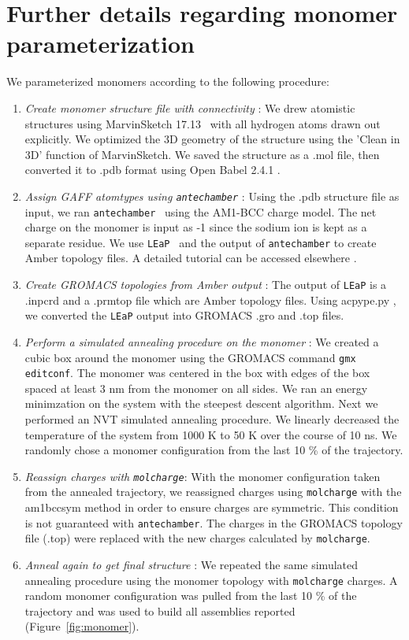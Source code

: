 \documentclass[journal=jpcbfk,manusciprt=article]{achemso}
\begin{document}
  \section{Further details regarding monomer parameterization}\label{section:parameterization}
 
  \vspace{1em}
  We parameterized monomers according to the following procedure:
  \begin{enumerate}
	\item \textit{Create monomer structure file with connectivity} : We
	drew atomistic structures using MarvinSketch
	17.13~\cite{chemaxon_marvinsketch_2017} with all hydrogen atoms drawn out
	explicitly. We optimized the 3D geometry of the structure using the 'Clean in
	3D' function of MarvinSketch.  We saved the structure as a .mol file, then
	converted it to .pdb format using Open Babel 2.4.1
	\cite{oboyle_open_2011,noauthor_open_nodate}. 
	\item \textit{Assign GAFF atomtypes using \texttt{antechamber}} : Using
	the .pdb structure file as input, we ran
	\texttt{antechamber}~\cite{wang_automatic_2006} using the AM1-BCC charge model.
	The net charge on the monomer is input as -1 since the sodium ion is kept as 
	a separate residue. We use \texttt{LEaP}~\cite{case_ambertools16_2016} and the
	output of \texttt{antechamber} to create Amber topology files. A detailed
	tutorial can be accessed elsewhere \cite{walker_antechamber_nodate}.
	\item \textit{Create GROMACS topologies from Amber output} : The output
	of \texttt{LEaP} is a .inpcrd and a .prmtop file which are Amber topology
	files. Using acpype.py \cite{sousa_da_silva_acpype_2012}, we converted the
	\texttt{LEaP} output into GROMACS .gro and .top files. 
	\item \textit{Perform a simulated annealing procedure on the monomer} :
	We created a cubic box around the monomer using the GROMACS command \texttt{gmx
	editconf}. The monomer was centered in the box with edges of the
	box spaced at least 3 nm from the monomer on all sides. We ran an energy minimzation
	on the system with the steepest descent algorithm. Next we performed an NVT
	simulated annealing procedure. We linearly decreased the temperature of the
	system from 1000 K to 50 K over the course of 10 ns. We randomly chose a monomer
	configuration from the last 10 \% of the trajectory. 
	\item \textit{Reassign charges with \texttt{molcharge}}: With the monomer
	configuration taken from the annealed trajectory, we reassigned charges using
	\texttt{molcharge} with the am1bccsym method in order to ensure charges 
	are symmetric. This condition is not guaranteed with \texttt{antechamber}. 
	The charges in the GROMACS topology file (.top) were replaced with the 
	new charges calculated by \texttt{molcharge}. 
	\item \textit{Anneal again to get final structure} : We repeated the
	same simulated annealing procedure using the monomer topology with
	\texttt{molcharge} charges. A random monomer configuration was pulled from the
	last 10 \% of the trajectory and was used to build all assemblies reported
	(Figure~\ref{fig:monomer}).
  \end{enumerate} 
\end{document}
